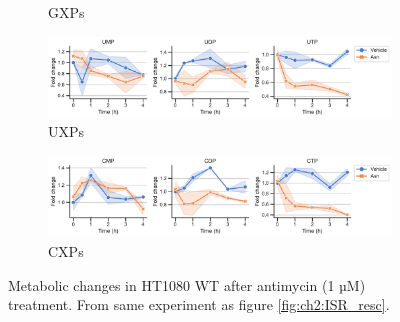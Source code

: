 \begin{figure}[!ht]
\begin{subfigure}[b]{0.68\textwidth}
        \caption{GXPs}
        \label{fig:app_ch2:HT1080_Anti_gxp}
    \end{subfigure}
    \hfill
    \begin{subfigure}[b]{0.68\textwidth}
        \includegraphics[width=\textwidth]{figures/chap2/app/HT1080_Anti_uxp.pdf}
        \caption{UXPs}
        \label{fig:app_ch2:HT1080_Anti_uxp}
    \end{subfigure}
    \hfill
    \begin{subfigure}[b]{0.68\textwidth}
        \includegraphics[width=\textwidth]{figures/chap2/app/HT1080_Anti_cxp.pdf}
        \caption{CXPs}
        \label{fig:app_ch2:HT1080_Anti_cxp}
    \end{subfigure}
    \hfill
        \caption[Metabolic changes in HT1080 after antimycin treatment]{
        Metabolic changes in HT1080 WT after antimycin (1 µM) treatment.
        From same experiment as figure \ref{fig:ch2:ISR_resc}.
        }
        \label{fig:app_ch2:HT1080_Anti_metab}
\end{figure}
















